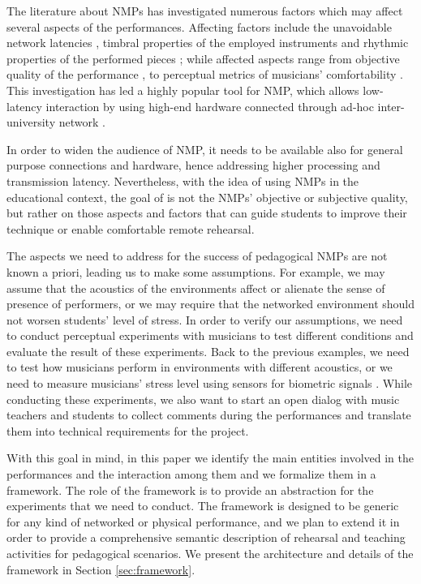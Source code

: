 The literature about NMPs has investigated numerous factors which may affect several aspects of the performances. Affecting factors include the unavoidable network latencies \cite{Chafe1}, timbral properties of the employed instruments \cite{Kolazi2013} and rhythmic properties of the performed pieces \cite{RottondiFeature}; while affected aspects range from objective quality of the performance \cite{Chafe3}, to perceptual metrics of musicians' comfortability \cite{CIM2018}. This investigation has led a highly popular tool for NMP, which allows low-latency interaction by using high-end hardware connected through ad-hoc inter-university network \cite{drioli2013networked}. 

In order to widen the audience of NMP, it needs to be available also for general purpose connections and hardware, hence addressing higher processing and transmission latency. Nevertheless, with the idea of using NMPs in the educational context, the goal of is not the NMPs' objective or subjective quality, but rather on those aspects and factors that can guide students to improve their technique or enable comfortable remote rehearsal. 

The aspects we need to address for the success of pedagogical NMPs are not known a priori, leading us to make some assumptions. For example, we may assume that the acoustics of the environments affect or alienate the sense of presence of performers, or we may require that the networked environment should not worsen students' level of stress. In order to verify our assumptions, we need to conduct perceptual experiments with musicians to test different conditions and evaluate the result of these experiments. Back to the previous examples, we need to test how musicians perform in environments with different acoustics, or we need to measure musicians' stress level using sensors for biometric signals \cite{Yoshie2009}. While conducting these experiments, we also want to start an open dialog with music teachers and students to collect comments during the performances and translate them into technical requirements for the project. 

With this goal in mind, in this paper we identify the main entities involved in the performances and the interaction among them and we formalize them in a framework. The role of the framework is to provide an abstraction for the experiments that we need to conduct. The framework is designed to be generic for any kind of networked or physical performance, and we plan to extend it in order to provide a comprehensive semantic description of rehearsal and teaching activities for pedagogical scenarios. We present the architecture and details of the framework in Section \ref{sec:framework}.

